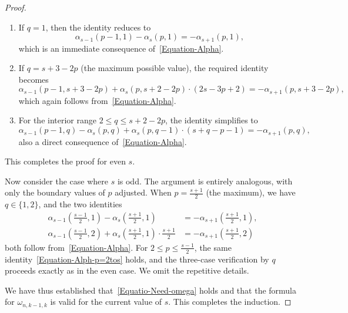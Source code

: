 \documentclass[10pt,a4paper]{amsart}
\begin{document}
\begin{proof}
\begin{enumerate}
\item If $q=1$, then the identity reduces to
\[
\alpha_{s-1}(p-1,1)-\alpha_s(p,1)=-\alpha_{s+1}(p,1),
\]
which is an immediate consequence of~\eqref{Equation-Alpha}.

\item If $q=s+3-2p$ (the maximum possible value), the required identity becomes
\[
\alpha_{s-1}(p-1,s+3-2p)+\alpha_s(p,s+2-2p)\cdot (2s-3p+2)=-\alpha_{s+1}(p,s+3-2p),
\]
which again follows from~\eqref{Equation-Alpha}.

\item For the interior range $2\leq q\leq s+2-2p$, the identity simplifies to
\[
\alpha_{s-1}(p-1,q)-\alpha_s(p,q)+\alpha_s(p,q-1)\cdot (s+q-p-1)=-\alpha_{s+1}(p,q),
\]
also a direct consequence of~\eqref{Equation-Alpha}.
\end{enumerate}

This completes the proof for even $s$.

Now consider the case where $s$ is odd.
The argument is entirely analogous, with only the boundary values of $p$ adjusted.
When $p=\frac{s+1}{2}$ (the maximum), we have $q\in\{1,2\}$, and the two identities
\begin{align*}
\alpha_{s-1}\left(\frac{s-1}{2},1\right)-\alpha_s\left(\frac{s+1}{2},1\right)&=-\alpha_{s+1}\left(\frac{s+1}{2},1\right),\\
\alpha_{s-1}\left(\frac{s-1}{2},2\right)+\alpha_s\left(\frac{s+1}{2},1\right)\cdot \frac{s+1}{2}
&=-\alpha_{s+1}\left(\frac{s+1}{2},2\right)
\end{align*}
both follow from~\eqref{Equation-Alpha}.
For $2\leq p\leq \frac{s-1}{2}$, the same identity~\eqref{Equation-Alph-p=2tos} holds, and the three-case verification by $q$ proceeds exactly as in the even case.
We omit the repetitive details.

We have thus established that~\eqref{Equatio-Need-omega} holds and that the formula for $\omega_{n,k-1,k}$ is valid for the current value of $s$.
This completes the induction.
\end{proof}
\end{document}
